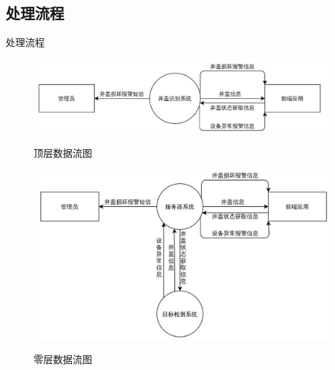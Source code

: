 \documentclass{beamer}
\begin{document}
\subsection{处理流程}
\begin{frame}{处理流程}
     \begin{figure}[h]
            \centering
            \includegraphics[height=.2\textheight]{dc.png}
            \label{顶层数据流图}
             \caption{顶层数据流图}
        \end{figure}
        \begin{figure}[h]
            \centering
            \includegraphics[height=.4\textheight]{lc.png}
            \label{零层数据流图}
             \caption{零层数据流图}
        \end{figure}
\end{frame}
\end{document}
